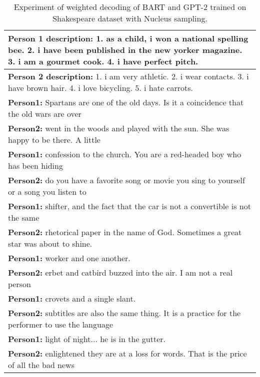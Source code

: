 \begin{table}[H]
\centering
 \begin{tabular}{|p{14cm}|} 
 \hline
 \textbf{Person 1 description:} 1. as a child, i won a national spelling bee. 2. i have been published in the new yorker magazine. 3. i am a gourmet cook. 4. i have perfect pitch. \\
 \hline
 \textbf{Person 2 description:} 1. i am very athletic. 2. i wear contacts. 3. i have brown hair. 4. i love bicycling. 5. i hate carrots. \\
 \hline
 \textbf{Person1:} Spartans are one of the old days. Is it a coincidence that the old wars are over \\
 \textbf{Person2:} went in the woods and played with the sun. She was happy to be there. A little  \\ 
 \textbf{Person1:} confession to the church. You are a red-headed boy who has been hiding \\
 \textbf{Person2:} do you have a favorite song or movie you sing to yourself or a song you listen to \\
 \textbf{Person1:} shifter, and the fact that the car is not a convertible is not the same \\
 \textbf{Person2:} rhetorical paper in the name of God. Sometimes a great star was about to shine. \\
 \textbf{Person1:} worker and one another. \\
 \textbf{Person2:} erbet and catbird buzzed into the air. I am not a real person \\
 \textbf{Person1:} crovets and a single slant. \\
 \textbf{Person2:} subtitles are also the same thing. It is a practice for the performer to use the language \\
 \textbf{Person1:} light of night... he is in the gutter. \\
 \textbf{Person2:} enlightened they are at a loss for words. That is the price of all the bad news \\
 \hline
 \end{tabular}
 \caption{Experiment of weighted decoding of BART and GPT-2 trained on Shakespeare dataset with Nucleus sampling.}
\label{tab:poetic_shakespear_nucleus}
\end{table}

